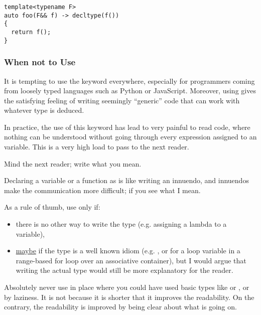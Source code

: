 \begin{lstlisting}
template<typename F>
auto foo(F&& f) -> decltype(f())
{
  return f();
}
\end{lstlisting}

\subsubsection{When not to Use }

It is tempting to use the  keyword everywhere, especially
for programmers coming from loosely typed languages such as Python or
JavaScript. Moreover, using  gives the satisfying feeling
of writing seemingly ``generic'' code that can work with whatever type
is deduced.

In practice, the use of this keyword has lead to very painful to read
code, where nothing can be understood without going through every
expression assigned to an  variable. This is a very high
load to pass to the next reader.

\begin{guideline}
Mind the next reader; write what you mean.

Declaring a variable or a function as  is like writing an
innuendo, and innuendos make the communication more difficult; if you
see what I mean.

As a rule of thumb, use  only if:
\begin{itemize}
\item there is no other way to write the type (e.g. assigning a
  lambda to a variable),
\item \underline{maybe} if the type is a well known idiom (e.g. , or for a loop variable in a range-based for
  loop over an associative container), but I would argue that writing
  the actual type would still be more explanatory for the reader.
\end{itemize}

Absolutely never use  in place where you could have used
basic types like  or , or by laziness. It is not
because it is shorter that it improves the readability. On the
contrary, the readability is improved by being clear about what is
going on.
\end{guideline}
